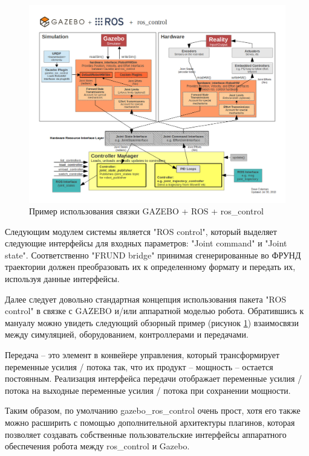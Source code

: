 \begin{figure}[h!]
	\centering
	\includegraphics[width = \linewidth]{img/roscontrol}
	\caption{Пример использования связки GAZEBO +{} ROS +{} ros\_control}
	\label{img:roscontrol}
\end{figure}

Следующим модулем системы является "ROS control"{}, который выделяет следующие интерфейсы для входных параметров: "Joint command"{} и "Joint state"{}. Соответственно "FRUND bridge"{} принимая сгенерированные во ФРУНД траектории должен преобразовать их к определенному формату и передать их, используя данные интерфейсы.

Далее следует довольно стандартная концепция использования пакета "ROS control"{} в связке с GAZEBO и/или аппаратной моделью робота. Обратившись к мануалу можно увидеть следующий обзорный пример (рисунок \ref{img:roscontrol}) взаимосвязи между симуляцией, оборудованием, контроллерами и передачами.

Передача – это элемент в конвейере управления, который трансформирует переменные усилия / потока так, что их продукт – мощность – остается постоянным. Реализация интерфейса передачи отображает переменные усилия / потока на выходные переменные усилия / потока при сохранении мощности.

Таким образом, по умолчанию gazebo\_ros\_control очень прост, хотя его также можно расширить с помощью дополнительной архитектуры плагинов, которая позволяет создавать собственные пользовательские интерфейсы аппаратного обеспечения робота между ros\_control и Gazebo.
 
